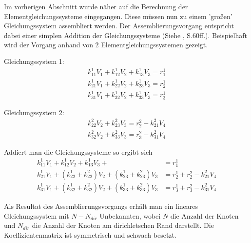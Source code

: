 Im vorherigen Abschnitt wurde näher auf die Berechnung der Elementgleichungssysteme eingegangen. Diese müssen nun zu einem 'großen' Gleichungssystem assembliert werden. Der Assemblierungsvorgang entspricht dabei einer simplen Addition der Gleichungssysteme (Siehe \cite{SMS_VO_skript}, S.60ff.). Beispielhaft wird der Vorgang anhand von 2 Elementgleichungssystemen gezeigt.

Gleichungssystem 1:
\begin{align*}
k_{11}^1 V_1 + k_{12}^1 V_2 + k_{13}^1 V_3 = r_1^1\\
k_{21}^1 V_1 + k_{22}^1 V_2 + k_{23}^1 V_3 = r_2^1\\
k_{31}^1 V_1 + k_{32}^1 V_2 + k_{33}^1 V_3 = r_3^1
\end{align*}


Gleichungssystem 2:
\begin{align*}
k_{22}^2 V_2 + k_{23}^2 V_3 = r_2^2 - k_{21}^2 V_4\\
k_{32}^2 V_2 + k_{33}^2 V_3 = r_3^2 - k_{31}^2 V_4
\end{align*}

Addiert man die Gleichungssysteme so ergibt sich
\begin{align}
k_{11}^1 V_1 + k_{12}^1 V_2 + k_{13}^1 V_3 +  &= r_1^1\\
k_{21}^1 V_1 + (k_{22}^1 +  k_{22}^2) V_2 + (k_{23}^1 + k_{23}^2) V_3 &= r_2^1 + r_2^2 - k_{21}^2 V_4 \nonumber\\
k_{31}^1 V_1 + (k_{32}^1 + k_{32}^2)  V_2 + ( k_{33}^1 + k_{33}^2) V_3 &= r_3^1 + r_3^2 - k_{31}^2 V_4 \nonumber
\end{align}

Als Resultat des Assemblierungsvorgangs erhält man ein lineares Gleichungssystem mit $N - N_{dir}$ Unbekannten, wobei $N$ die Anzahl der Knoten und $N_{dir}$ die Anzahl der Knoten am dirichletschen Rand darstellt. Die Koeffizientenmatrix ist symmetrisch und schwach besetzt.
\newline

